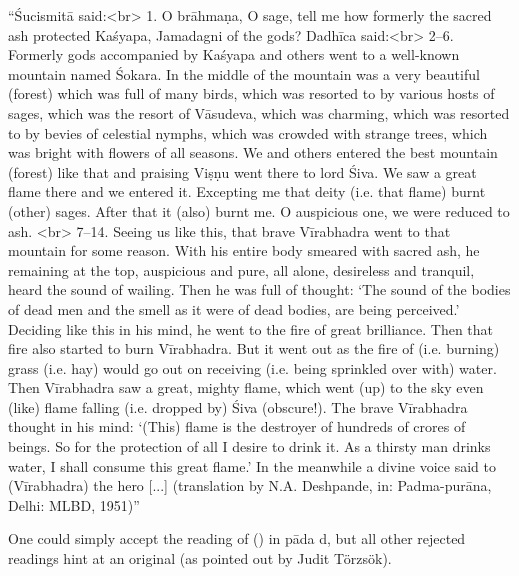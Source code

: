 {  ``Śucismitā said:<br>  1. O brāhmaṇa, O sage, tell me how formerly the sacred ash protected Kaśyapa, Jamadagni of the gods? Dadhīca said:<br>  2--6. Formerly gods accompanied by Kaśyapa and others went to a well-known mountain named Śokara. In the middle of the mountain was a very beautiful (forest) which was full of many birds, which was resorted to by various hosts of sages, which was the resort of Vāsudeva, which was charming, which was resorted to by bevies of celestial nymphs, which was crowded with strange trees, which was bright with flowers of all seasons. We and others entered the best mountain (forest) like that and praising Viṣṇu went there to lord Śiva. We saw a great flame there and we entered it. Excepting me that deity (i.e. that flame) burnt (other) sages. After that it (also) burnt me. O auspicious one, we were reduced to ash. <br> 7--14. Seeing us like this, that brave Vīrabhadra went to that mountain for some reason. With his entire body smeared with sacred ash, he remaining at the top, auspicious and pure, all alone, desireless and tranquil, heard the sound of wailing. Then he was full of thought: ‘The sound of the bodies of dead men and the smell as it were of dead bodies, are being perceived.’ Deciding like this in his mind, he went to the fire of great brilliance. Then that fire also started to burn Vīrabhadra. But it went out as the fire of (i.e. burning) grass (i.e. hay) would go out on receiving (i.e. being sprinkled over with) water. Then Vīrabhadra saw a great, mighty flame, which went (up) to the sky even (like) flame falling (i.e. dropped by) Śiva (obscure!). The brave Vīrabhadra thought in his mind: ‘(This) flame is the destroyer of hundreds of crores of beings. So for the protection of all I desire to drink it. As a thirsty man drinks water, I shall consume this great flame.’ In the meanwhile a divine voice said to (Vīrabhadra) the hero [...] (translation by N.A. Deshpande, in: Padma-purāna, Delhi: MLBD, 1951)''   }





{ One could simply accept the reading of \msCc () in pāda d, but all other rejected                  readings hint at an original  (as pointed out by Judit Törzsök). }




